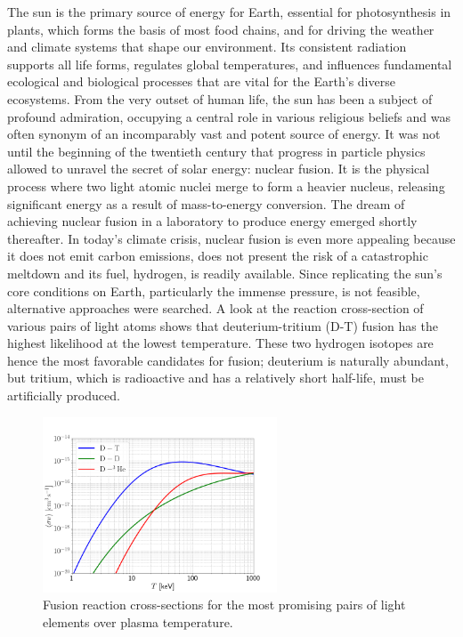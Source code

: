 The sun is the primary source of energy for Earth, essential for photosynthesis in plants, which forms the basis of most food chains, and for driving the weather and climate systems that shape our environment. Its consistent radiation supports all life forms, regulates global temperatures, and influences fundamental ecological and biological processes that are vital for the Earth's diverse ecosystems. From the very outset of human life, the sun has been a subject of profound admiration, occupying a central role in various religious beliefs and was often synonym of an incomparably vast and potent source of energy. It was not until the beginning of the twentieth century that progress in particle physics allowed to unravel the secret of solar energy: nuclear fusion. It is the physical process where two light atomic nuclei merge to form a heavier nucleus, releasing significant energy as a result of mass-to-energy conversion. \newline 
The dream of achieving nuclear fusion in a laboratory to produce energy emerged shortly thereafter. In today's climate crisis, nuclear fusion is even more appealing because it does not emit carbon emissions, does not present the risk of a catastrophic meltdown and its fuel, hydrogen, is readily available. Since replicating the sun's core conditions on Earth, particularly the immense pressure, is not feasible, alternative approaches were searched. A look at the reaction cross-section of various pairs of light atoms shows that deuterium-tritium (D-T) fusion has the highest likelihood at the lowest temperature. These two hydrogen isotopes are hence the most favorable candidates for fusion; deuterium is naturally abundant, but tritium, which is radioactive and has a relatively short half-life, must be artificially produced. \newline

\begin{figure}[H]
	\centering
	\includegraphics[width=0.62\textwidth]{schemes/fusion-reactivities.png}
	\caption{Fusion reaction cross-sections for the most promising pairs of light elements over plasma temperature.}
	\label{fig:Intro_fusionCrossSections}
\end{figure}


